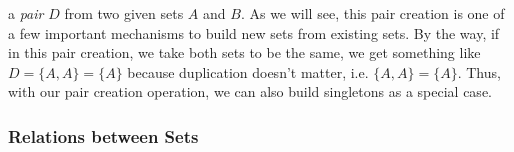 a \emph{pair} $D$ from two given sets $A$ and $B$. As we will see, this pair creation is one of a few important mechanisms to build new sets from existing sets. By the way, if in this pair creation, we take both sets to be the same, we get something like $D = \{ A, A \} = \{ A \}$ because duplication doesn't matter, i.e. $ \{ A, A \} = \{ A \}$. Thus, with our pair creation operation, we can also build singletons as a special case.


\subsubsection{Relations between Sets}
